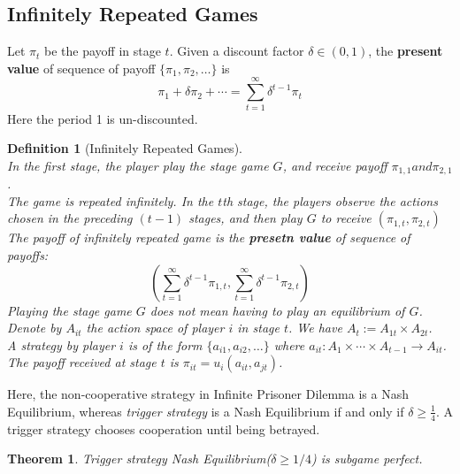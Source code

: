 \documentclass[12pt]{article}
\newtheorem{definition}{Definition}[section]
\newtheorem{theorem}{Theorem}[section]
\theoremstyle{definition}
\begin{document}
\subsection{Infinitely Repeated Games}
Let $\pi_t$ be the payoff in stage $t$. Given a discount factor $\delta\in (0,1)$, the \textbf{present value} of sequence of payoff $\{\pi_1,\pi_2,\ldots\}$ is
\[
\pi_1+\delta\pi_2+\cdots = \sum_{t=1}^\infty \delta^{t-1} \pi_t
\]
Here the period 1 is un-discounted.
\begin{definition}[Infinitely Repeated Games]
\hfill\\\normalfont In the first stage, the player play the stage game $G$, and receive payoff $\pi_{1,1} and \pi_{2,1}$.\\
The game is repeated infinitely. In the $t$th stage, the players observe the actions chosen in the preceding $(t-1)$ stages, and then play $G$ to receive $(\pi_{1,t}, \pi_{2,t})$\\
The payoff of infinitely repeated game is the \textbf{presetn value} of sequence of payoffs:
\[
(\sum_{t=1}^\infty \delta^{t-1}\pi_{1,t}, \sum_{t=1}^\infty \delta^{t-1}\pi_{2,t})
\]
Playing the stage game $G$ does not mean having to play an equilibrium of $G$.\\
Denote by $A_{it}$ the action space of player $i$ in stage $t$. We have $A_t:=A_{1t}\times A_{2t}$.\\
A strategy by player $i$ is of the form $\{a_{i1}, a_{i2},\ldots\}$ where $a_{it}:A_1\times\cdots\times A_{t-1}\to A_{it}$.\\
The payoff received at stage $t$ is $\pi_{it}=u_i(a_{it}, a_{jt})$.
\end{definition}
Here, the non-cooperative strategy in Infinite Prisoner Dilemma is a Nash Equilibrium, whereas \textit{trigger strategy} is a Nash Equilibrium if and only if $\delta\geq \frac{1}{4}$. A trigger strategy chooses cooperation until being betrayed.
\begin{theorem}\normalfont Trigger strategy Nash Equilibrium($\delta\geq 1/4$) is subgame perfect.\end{theorem}
\end{document}
